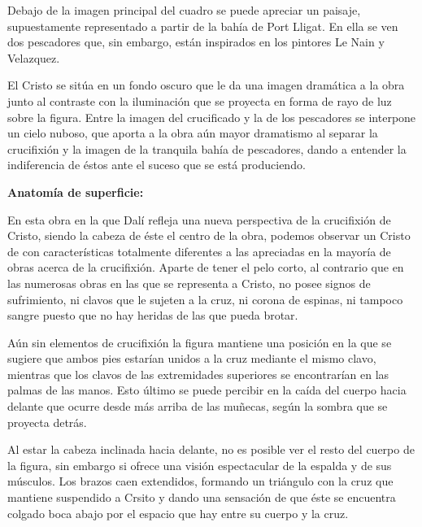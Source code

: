Debajo de la imagen principal del cuadro se puede apreciar un paisaje, supuestamente representado a partir de la bahía de Port Lligat. En ella se ven dos pescadores que, sin embargo, están inspirados en los pintores Le Nain y Velazquez.

El Cristo se sitúa en un fondo oscuro que le da una imagen dramática a la obra junto al contraste con la iluminación que se proyecta en forma de rayo de luz sobre la figura. Entre la imagen del crucificado y la de los pescadores se interpone un cielo nuboso, que aporta a la obra aún mayor dramatismo al separar la crucifixión y la imagen de la tranquila bahía de pescadores, dando a entender la indiferencia de éstos ante el suceso que se está produciendo.


\vspace{12pt}
\textbf{Anatomía de superficie:}

En esta obra en la que Dalí refleja una nueva perspectiva de la crucifixión de Cristo, siendo la cabeza de éste el centro de la obra, podemos observar un Cristo de con características totalmente diferentes a las apreciadas en la mayoría de obras acerca de la crucifixión. Aparte de tener el pelo corto, al contrario que en las numerosas obras en las que se representa a Cristo, no posee signos de sufrimiento, ni clavos que le sujeten a la cruz, ni corona de espinas, ni tampoco sangre puesto que no hay heridas de las que pueda brotar.

Aún sin elementos de crucifixión la figura mantiene una posición en la que se sugiere que ambos pies estarían unidos a la cruz mediante el mismo clavo, mientras que los clavos de las extremidades superiores se encontrarían en las palmas de las manos. Esto último se puede percibir en la caída del cuerpo hacia delante que ocurre desde más arriba de las muñecas, según la sombra que se proyecta detrás.

Al estar la cabeza inclinada hacia delante, no es posible ver el resto del cuerpo de la figura, sin embargo si ofrece una visión espectacular de la espalda y de sus músculos. Los brazos caen extendidos, formando un triángulo con la cruz que mantiene suspendido a Crsito y dando una sensación de que éste se encuentra colgado boca abajo por el espacio que hay entre su cuerpo y la cruz.

